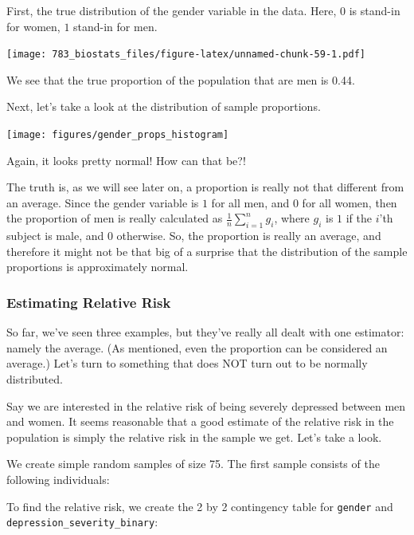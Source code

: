 \documentclass[]{book}
\theoremstyle{definition}
\theoremstyle{definition}
\theoremstyle{definition}
\theoremstyle{remark}
\begin{document}
First, the true distribution of the gender variable in the data. Here, \(0\) is stand-in for women, \(1\) stand-in for men.

\texttt{[image: 783\_biostats\_files/figure-latex/unnamed-chunk-59-1.pdf]}

We see that the true proportion of the population that are men is 0.44.

Next, let's take a look at the distribution of sample proportions.

\texttt{[image: figures/gender\_props\_histogram]}

Again, it looks pretty normal! How can that be?!

The truth is, as we will see later on, a proportion is really not that different from an average. Since the gender variable is \(1\) for all men, and \(0\) for all women, then the proportion of men is really calculated as \(\frac{1}{n}\sum_{i=1}^n g_i\), where \(g_i\) is \(1\) if the \(i\)'th subject is male, and \(0\) otherwise. So, the proportion is really an average, and therefore it might not be that big of a surprise that the distribution of the sample proportions is approximately normal.

\hypertarget{estimating-relative-risk}{%
\subsubsection*{Estimating Relative Risk}\label{estimating-relative-risk}}

So far, we've seen three examples, but they've really all dealt with one estimator: namely the average. (As mentioned, even the proportion can be considered an average.) Let's turn to something that does NOT turn out to be normally distributed.

Say we are interested in the relative risk of being severely depressed between men and women. It seems reasonable that a good estimate of the relative risk in the population is simply the relative risk in the sample we get. Let's take a look.

We create simple random samples of size 75. The first sample consists of the following individuals:

\hypertarget{htmlwidget-b9150501cb8ba77e69a3}{}

To find the relative risk, we create the 2 by 2 contingency table for \texttt{gender} and \texttt{depression\_severity\_binary}:
\end{document}
